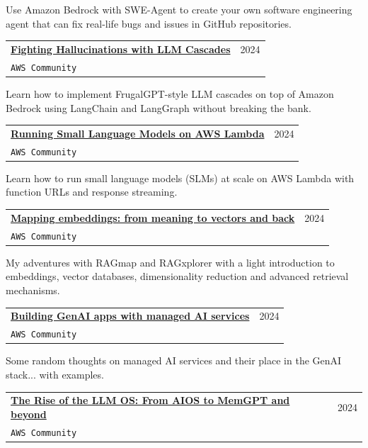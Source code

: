\documentclass[letterpaper,11pt]{article}
\makeatletter
\newcommand{\resumeSubheading}[4]{
  \vspace{-2pt}\item
    \begin{tabular*}{0.97\textwidth}[t]{l@{\extracolsep{\fill}}r}
      \textbf{#1} & #2 \\
      \texttt{\small#3} & \textit{\small #4} \\
    \end{tabular*}\vspace{-7pt}
}
\makeatother
\begin{document}
    Use Amazon Bedrock with SWE-Agent to create your own software engineering agent that can fix real-life bugs and issues in GitHub repositories.
    
    \vspace{2mm}
    \resumeSubheading
      {\href{https://community.aws/content/2fTJuxaxuSwl64cVakqtuEK4tnl/running-small-language-models-on-aws-lambda}{Fighting Hallucinations with LLM Cascades}}{2024}
      {AWS Community}{}
    \vspace{3mm}

    Learn how to implement FrugalGPT-style LLM cascades on top of Amazon Bedrock using LangChain and LangGraph without breaking the bank.
    
    \vspace{2mm}
    \resumeSubheading
      {\href{https://community.aws/content/2fTJuxaxuSwl64cVakqtuEK4tnl/running-small-language-models-on-aws-lambda}{Running Small Language Models on AWS Lambda}}{2024}
      {AWS Community}{}
    \vspace{3mm}

    Learn how to run small language models (SLMs) at scale on AWS Lambda with function URLs and response streaming.
    
    \vspace{2mm}
    \resumeSubheading
      {\href{https://community.aws/content/2eoCtgociSBhGfirRM0Tk0PSgxH/mapping-embeddings-from-meaning-to-vectors-and-back}{Mapping embeddings: from meaning to vectors and back}}{2024}
      {AWS Community}{}
    \vspace{3mm}

    My adventures with RAGmap and RAGxplorer with a light introduction to embeddings, vector databases, dimensionality reduction and advanced retrieval mechanisms.
    
    \vspace{2mm}
    \resumeSubheading
      {\href{https://community.aws/content/2evcvfrOpxaXTIv3uPchFaKKjAf/tgifun-building-genai-apps-with-managed-ai-services}{Building GenAI apps with managed AI services}}{2024}
      {AWS Community}{}
    \vspace{3mm}

    Some random thoughts on managed AI services and their place in the GenAI stack... with examples.
    
    \vspace{2mm}
    \resumeSubheading
      {\href{https://community.aws/content/2eojjD2E7TBgPFJmB2FGAtrSSBh/the-rise-of-the-llm-os-from-aios-to-memgpt-and-beyond}{The Rise of the LLM OS: From AIOS to MemGPT and beyond}}{2024}
      {AWS Community}{}
    \vspace{3mm}
\end{document}
